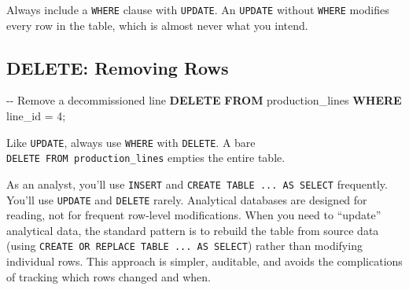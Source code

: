 \documentclass[
  letterpaper,
  DIV=11,
  numbers=noendperiod]{scrreprt}
\newenvironment{Shaded}{\begin{snugshade}}{\end{snugshade}}
\newcommand{\CommentTok}[1]{\textcolor[rgb]{0.37,0.37,0.37}{#1}}
\newcommand{\DecValTok}[1]{\textcolor[rgb]{0.68,0.00,0.00}{#1}}
\newcommand{\KeywordTok}[1]{\textcolor[rgb]{0.00,0.23,0.31}{\textbf{#1}}}
\newcommand{\NormalTok}[1]{\textcolor[rgb]{0.00,0.23,0.31}{#1}}
\newcommand{\OperatorTok}[1]{\textcolor[rgb]{0.37,0.37,0.37}{#1}}
\begin{document}
Always include a \texttt{WHERE} clause with \texttt{UPDATE}. An
\texttt{UPDATE} without \texttt{WHERE} modifies every row in the table,
which is almost never what you intend.

\subsection{DELETE: Removing Rows}\label{delete-removing-rows}

\begin{codelisting}

\caption{\texttt{duckdb}}

\begin{Shaded}
\begin{Highlighting}[]
\CommentTok{{-}{-} Remove a decommissioned line}
\KeywordTok{DELETE} \KeywordTok{FROM}\NormalTok{ production\_lines}
\KeywordTok{WHERE}\NormalTok{ line\_id }\OperatorTok{=} \DecValTok{4}\NormalTok{;}
\end{Highlighting}
\end{Shaded}

\end{codelisting}

Like \texttt{UPDATE}, always use \texttt{WHERE} with \texttt{DELETE}. A
bare \texttt{DELETE\ FROM\ production\_lines} empties the entire table.

\begin{tcolorbox}[enhanced jigsaw, opacitybacktitle=0.6, arc=.35mm, colback=white, bottomtitle=1mm, opacityback=0, toprule=.15mm, left=2mm, colbacktitle=quarto-callout-warning-color!10!white, breakable, coltitle=black, toptitle=1mm, colframe=quarto-callout-warning-color-frame, bottomrule=.15mm, titlerule=0mm, title=\textcolor{quarto-callout-warning-color}{\faExclamationTriangle}\hspace{0.5em}{DML in Analytical Workflows}, rightrule=.15mm, leftrule=.75mm]

As an analyst, you'll use \texttt{INSERT} and
\texttt{CREATE\ TABLE\ ...\ AS\ SELECT} frequently. You'll use
\texttt{UPDATE} and \texttt{DELETE} rarely. Analytical databases are
designed for reading, not for frequent row-level modifications. When you
need to ``update'' analytical data, the standard pattern is to rebuild
the table from source data (using
\texttt{CREATE\ OR\ REPLACE\ TABLE\ ...\ AS\ SELECT}) rather than
modifying individual rows. This approach is simpler, auditable, and
avoids the complications of tracking which rows changed and when.

\end{tcolorbox}
\end{document}
